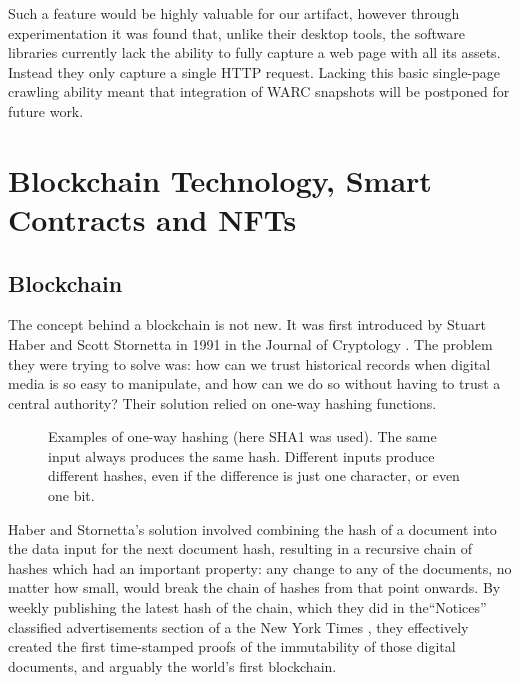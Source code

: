Such a feature would be highly valuable for our artifact, however through experimentation it was found that, unlike their desktop tools, the software libraries currently lack the ability to fully capture a web page with all its assets. Instead they only capture a single HTTP request. Lacking this basic single-page crawling ability meant that integration of WARC snapshots will be postponed for future work.


\section{Blockchain Technology, Smart Contracts and NFTs}


\subsection{Blockchain}
\label{sub:blockchain}

The concept behind a blockchain is not new. It was first introduced by Stuart Haber and Scott Stornetta in 1991 in the Journal of Cryptology \cite{haberHowTimeStampDigital1991}. The problem they were trying to solve was: how can we trust historical records when digital media is so easy to manipulate, and how can we do so without having to trust a central authority? Their solution relied on one-way hashing functions.


\begin{figure}[h]
    \centering
    \captionsetup{justification=centering}
    
    \caption[One-way hashing examples]{Examples of one-way hashing (here SHA1 was used). The same input always produces the same hash. Different inputs produce different hashes, even if the difference is just one character, or even one bit.}
    \label{fig:hashing}
\end{figure}

Haber and Stornetta's solution involved combining the hash of a document into the data input for the next document hash, resulting in a recursive chain of hashes which had an important property: any change to any of the documents, no matter how small, would break the chain of hashes from that point onwards.
By weekly publishing the latest hash of the chain, which they did in the``Notices'' classified advertisements section of a the New York Times \cite{whitakerArtBlockchainPrimer2019}, they effectively created the first time-stamped proofs of the immutability of those digital documents, and arguably the world's first blockchain.

